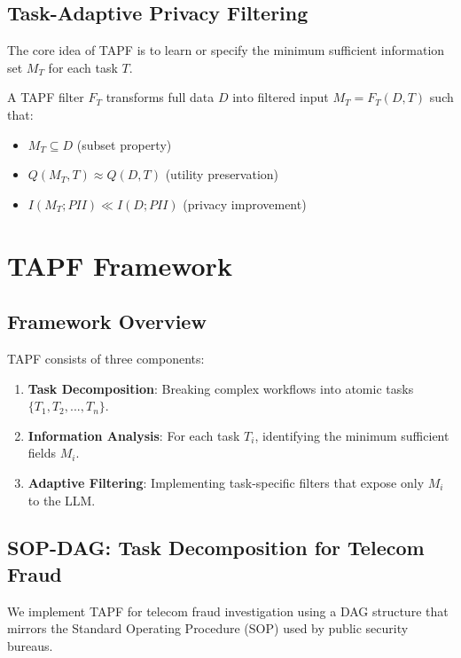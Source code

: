 \documentclass[letterpaper]{article}
\begin{document}
\subsection{Task-Adaptive Privacy Filtering}

The core idea of TAPF is to learn or specify the minimum sufficient information set $M_T$ for each task $T$.

\begin{definition}
A TAPF filter $F_T$ transforms full data $D$ into filtered input $M_T = F_T(D, T)$ such that:
\begin{itemize}
    \item $M_T \subseteq D$ (subset property)
    \item $Q(M_T, T) \approx Q(D, T)$ (utility preservation)
    \item $I(M_T; PII) \ll I(D; PII)$ (privacy improvement)
\end{itemize}
\end{definition}

\section{TAPF Framework}

\subsection{Framework Overview}

TAPF consists of three components:

\begin{enumerate}
    \item \textbf{Task Decomposition}: Breaking complex workflows into atomic tasks $\{T_1, T_2, ..., T_n\}$.
    \item \textbf{Information Analysis}: For each task $T_i$, identifying the minimum sufficient fields $M_i$.
    \item \textbf{Adaptive Filtering}: Implementing task-specific filters that expose only $M_i$ to the LLM.
\end{enumerate}

\subsection{SOP-DAG: Task Decomposition for Telecom Fraud}

We implement TAPF for telecom fraud investigation using a DAG structure that mirrors the Standard Operating Procedure (SOP) used by public security bureaus.
\end{document}
